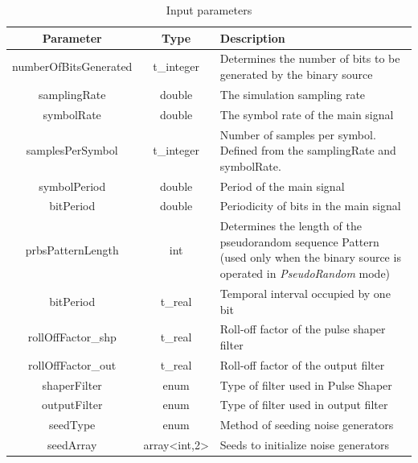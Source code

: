 	\begin{longtable}[h]{|c|c|p{5cm}|}
		\caption{Input parameters}\label{table:in_par}\\\hline

		\textbf{Parameter} & \textbf{Type} & \textbf{Description}     \\ \hline

		numberOfBitsGenerated         & t\_integer
																	& Determines the number of bits to be generated by the
																	binary source\\ \hline
		samplingRate                  & double
																	& The simulation sampling rate \\\hline
		symbolRate                    & double
																	& The symbol rate of the main signal \\\hline
		samplesPerSymbol              & t\_integer
																	& Number of samples per symbol. Defined from
																	the samplingRate and symbolRate.    \\ \hline
		symbolPeriod                  & double
																	& Period of the main signal \\\hline
		bitPeriod                     & double
																	& Periodicity of bits in the main signal \\\hline
		prbsPatternLength             & int
																	& Determines the length of the pseudorandom
																	sequence Pattern (used only when the binary
																	source is operated in \textit{PseudoRandom}
																	mode)     \\ \hline
		bitPeriod                     & t\_real
																	& Temporal interval occupied by one bit     \\ \hline
		rollOffFactor\_shp            & t\_real
																	& Roll-off factor of the pulse shaper filter     \\ \hline
		rollOffFactor\_out            & t\_real
																	& Roll-off factor of the output filter     \\ \hline
		shaperFilter                  & enum
																	& Type of filter used in Pulse Shaper     \\ \hline
		outputFilter                  & enum
																	& Type of filter used in output filter     \\ \hline
		seedType                      & enum
																	& Method of seeding noise generators     \\ \hline
		seedArray                     & array<int,2>
																	& Seeds to initialize noise generators     \\ \hline

\end{longtable}
